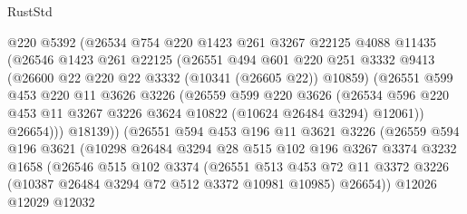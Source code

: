 \begin{lexlean}{RustStd}
\begin{coremodule}
{\begin{coremodule}
{{{{{{{{{{{{{{{{{{{{{{{{{                  @220
                  @5392
                  (@26534
                    @754
                    @220
                    @1423
                    @261
                    @3267
                    @22125
                    @4088
                    @11435
                    (@26546
                      @1423
                      @261
                      @22125
                      (@26551
                        @494
                        @601
                        @220
                        @251
                        @3332
                        @9413
                        (@26600 @22 @220 @22 @3332 (@10341 (@26605 @22)) @10859)
                        (@26551
                          @599
                          @453
                          @220
                          @11
                          @3626
                          @3226
                          (@26559
                            @599
                            @220
                            @3626
                            (@26534
                              @596
                              @220
                              @453
                              @11
                              @3267
                              @3226
                              @3624
                              @10822
                              (@10624 @26484 @3294)
                              @12061))
                          @26654)))
                    @18139))
                (@26551
                  @594
                  @453
                  @196
                  @11
                  @3621
                  @3226
                  (@26559
                    @594
                    @196
                    @3621
                    (@10298
                      @26484
                      @3294
                      @28
                      @515
                      @102
                      @196
                      @3267
                      @3374
                      @3232
                      @1658
                      (@26546
                        @515
                        @102
                        @3374
                        (@26551
                          @513
                          @453
                          @72
                          @11
                          @3372
                          @3226
                          (@10387 @26484 @3294 @72 @512 @3372 @10981 @10985)
                          @26654))
                      @12026
                      @12029
                      @12032
}}}}}}}}}}}}}}}}}}}}}}}}}
\end{coremodule}}
\end{coremodule}
\end{lexlean}
